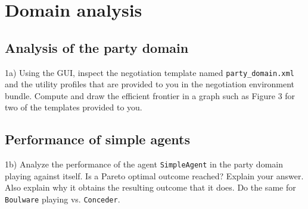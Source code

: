 \chapter{Domain analysis}

\section{Analysis of the party domain}

1a) Using the GUI, inspect the negotiation template named \texttt{party\_domain.xml} and the utility profiles that are provided to you in the negotiation environment bundle. Compute and draw the efficient frontier in a graph such as Figure 3 for two of the templates provided to you.

\section{Performance of simple agents}

1b) Analyze the performance of the agent \texttt{SimpleAgent} in the party domain playing against itself. Is a Pareto optimal outcome reached? Explain your answer. Also explain why it obtains the resulting outcome that it does. Do the same for \texttt{Boulware} playing vs. \texttt{Conceder}.